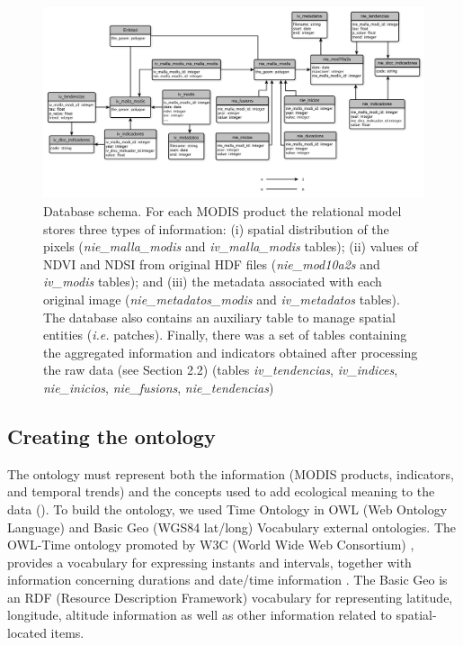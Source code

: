 \begin{figure}
\centering
\includegraphics[]{img/onto/onto-database}\caption{Database schema. For each MODIS product the relational model stores three types of information: (i) spatial distribution of the pixels (\emph{nie\_malla\_modis} and \emph{iv\_malla\_modis} tables); (ii) values of NDVI and NDSI from original HDF files (\emph{nie\_mod10a2s} and \emph{iv\_modis} tables); and (iii) the metadata associated with each original image (\emph{nie\_metadatos\_modis} and \emph{iv\_metadatos} tables). The database also contains an auxiliary table to manage spatial entities (\emph{i.e.} \Qpy patches). Finally, there was a set of tables containing the aggregated information and indicators obtained after processing the raw data (see Section 2.2) (tables \emph{iv\_tendencias}, \emph{iv\_indices}, \emph{nie\_inicios}, \emph{nie\_fusions}, \emph{nie\_tendencias})}\label{fig:onto:database}
\end{figure}

\subsection{Creating the ontology}\label{sec:onto:Creating}

The ontology must represent both the information (MODIS products, indicators, and temporal trends) and the concepts used to add ecological meaning to the data (). To build the ontology, we used Time Ontology in OWL (Web Ontology Language) \autocite{HobbsPan2004OntologyTime} and Basic Geo (WGS84 lat/long) Vocabulary \autocite{Brickley2003BasicGeo} external ontologies. The OWL-Time ontology promoted by W3C (World Wide Web Consortium) \autocite{W3C2013LargeTriple}, provides a vocabulary for expressing instants and intervals, together with information concerning durations and date/time information \autocite{HobbsPan2004OntologyTime}. The Basic Geo is an RDF (Resource Description Framework) vocabulary for representing latitude, longitude, altitude information as well as other information related to spatial-located items.

